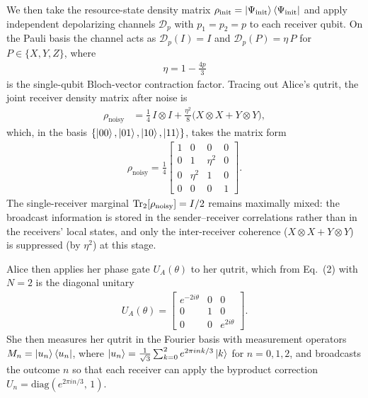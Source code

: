 We then take the resource-state density matrix $\rho_{\text{init}} = \ket{\Psi_{\text{init}}}\bra{\Psi_{\text{init}}}$ and apply independent depolarizing channels $\mathcal{D}_p$ with $p_1 = p_2 = p$ to each receiver qubit. On the Pauli basis the channel acts as $\mathcal{D}_p(I)=I$ and $\mathcal{D}_p(P)=\eta\,P$ for $P\in\{X,Y,Z\}$, where
\begin{align}
    \eta = 1 - \tfrac{4p}{3}
\end{align}
is the single-qubit Bloch-vector contraction factor. Tracing out Alice's qutrit, the joint receiver density matrix after noise is
\begin{align}
    \rho_{\text{noisy}} &= \tfrac{1}{4}\, I\!\otimes\!I + \tfrac{\eta^2}{8}\big(X\!\otimes\!X + Y\!\otimes\!Y\big),
\end{align}
which, in the basis $\{\ket{00},\ket{01},\ket{10},\ket{11}\}$, takes the matrix form
\begin{align}
    \rho_{\text{noisy}} = \frac{1}{4}\begin{bmatrix}
    1 & 0 & 0 & 0 \\
    0 & 1 & \eta^2 & 0 \\
    0 & \eta^2 & 1 & 0 \\
    0 & 0 & 0 & 1
    \end{bmatrix}.
\end{align}
The single-receiver marginal $\operatorname{Tr}_2[\rho_{\text{noisy}}] = I/2$ remains maximally mixed: the broadcast information is stored in the sender--receiver correlations rather than in the receivers' local states, and only the inter-receiver coherence ($X\!\otimes\!X + Y\!\otimes\!Y$) is suppressed (by $\eta^2$) at this stage.

Alice then applies her phase gate $U_A(\theta)$ to her qutrit, which from Eq.~(2) with $N=2$ is the diagonal unitary
\begin{align}
    U_A(\theta) = \begin{bmatrix}
        e^{-2i\theta} & 0 & 0 \\
        0 & 1 & 0 \\
        0 & 0 & e^{2i\theta}
        \end{bmatrix}.
\end{align}
She then measures her qutrit in the Fourier basis with measurement operators $M_n = \ket{u_n}\bra{u_n}$, where $\ket{u_n} = \frac{1}{\sqrt{3}}\sum_{k=0}^2 e^{2\pi i nk/3}\ket{k}$ for $n=0,1,2$, and broadcasts the outcome $n$ so that each receiver can apply the byproduct correction $U_n = \mathrm{diag}(e^{2\pi i n/3},\,1)$.


